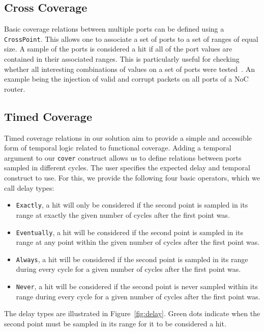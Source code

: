 \documentclass[a4paper]{IEEEtran}
\begin{document}
\subsection{Cross Coverage}
Basic coverage relations between multiple ports can be defined using a \texttt{CrossPoint}. 
This allows one to associate a set of ports to a set of ranges of equal size.  
A sample of the ports is considered a hit if all of the port values are contained in their associated ranges. This is particularly useful for checking whether all interesting combinations of values on a set of ports were tested~\cite{hdlverify}. An example being the injection of valid and corrupt packets on all ports of a NoC router. %

\subsection{Timed Coverage}
Timed coverage relations in our solution aim to provide a simple and accessible form of temporal logic related to functional coverage. Adding a temporal argument to our \texttt{cover} construct allows us to define relations between ports sampled in different cycles. The user specifies the expected delay and temporal construct to use. For this, we provide the following four basic operators, which we call delay types:%
\begin{itemize}
 \item \texttt{Exactly}, a hit will only be considered if the second point is sampled in its range at exactly the given number of cycles after the first point was.
 \item \texttt{Eventually}, a hit will be considered if the second point is sampled in its range at any point within the given number of cycles after the first point was.  
 \item \texttt{Always}, a hit will be considered if the second point is sampled in its range during every cycle for a given number of cycles after the first point was.
 \item \texttt{Never}, a hit will be considered if the second point is never sampled within its range during every cycle for a given number of cycles after the first point was.
\end{itemize}  
The delay types are illustrated in Figure~\ref{fig:delay}. Green dots indicate when the second point must be sampled in its range for it to be considered a hit. %
\end{document}
